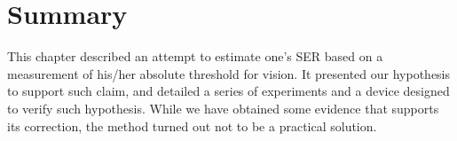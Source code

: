 \section{Summary}

This chapter described an attempt to estimate one's SER based on a measurement of his/her absolute threshold for vision. It presented our hypothesis to support such claim, and detailed a series of experiments and a device designed to verify such hypothesis. While we have obtained some evidence that supports its correction, the method turned out not to be a practical solution.
